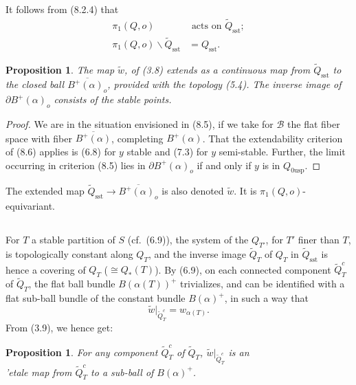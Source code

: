 \documentclass[12pt,a4paper]{article}
\theoremstyle{plain}
\newtheorem{proposition}[theorem]{Proposition}
\theoremstyle{definition}
\theoremstyle{remark}
\numberwithin{equation}{section}
\begin{document}
It follows from (8.2.4) that
\begin{align}
\pi_1(Q, o) &\text{ acts on } \widetilde{Q}_{\mathrm{sst}}; \label{eq:8.6.1} \\
\pi_1(Q, o) \backslash \widetilde{Q}_{\mathrm{sst}} &= Q_{\mathrm{sst}}. \label{eq:8.6.2}
\end{align}

\begin{proposition}\label{prop:8.7}
The map $\widetilde{w}$, of (3.8) extends as a continuous map from $\widetilde{Q}_{\mathrm{sst}}$ to the closed ball $\overline{B^+(\alpha)_o}$, provided with the topology (5.4). The inverse image of $\partial B^+(\alpha)_o$ consists of the stable points.
\end{proposition}

\begin{proof}
We are in the situation envisioned in (8.5), if we take for $\mathscr{B}$ the flat fiber space with fiber $\overline{B^+(\alpha)}$, completing $B^+(\alpha)$. That the extendability criterion of (8.6) applies is (6.8) for $y$ stable and (7.3) for $y$ semi-stable. Further, the limit occurring in criterion (8.5) lies in $\partial B^+(\alpha)_o$ if and only if $y$ is in $Q_{0\mathrm{usp}}$.
\end{proof}

The extended map $\widetilde{Q}_{\mathrm{sst}} \to \overline{B^+(\alpha)_o}$ is also denoted $\widetilde{w}$. It is $\pi_1(Q, o)$-equivariant.

\subsection{}
For $T$ a stable partition of $S$ (cf.\ (6.9)), the system of the $Q_{T'}$, for $T'$ finer than $T$, is topologically constant along $Q_T$, and the inverse image $\widetilde{Q}_T$ of $Q_T$ in $\widetilde{Q}_{\mathrm{sst}}$ is hence a covering of $Q_T$ ($\cong Q_*(T)$). By (6.9), on each connected component $\widetilde{Q}_T^c$ of $\widetilde{Q}_T$, the flat ball bundle $B(\alpha(T))^+$ trivializes, and can be identified with a flat sub-ball bundle of the constant bundle $B(\alpha)^+$, in such a way that
\begin{equation}\label{eq:8.8.1}
\widetilde{w}|_{\widetilde{Q}_T^c} = w_{\alpha(T)}.
\end{equation}
From (3.9), we hence get:
\begin{proposition}\label{prop:8.9}
For any component $\widetilde{Q}_T^c$ of $\widetilde{Q}_T$, $\widetilde{w}|_{\widetilde{Q}_T^c}$ is an \\'etale map from $\widetilde{Q}_T^c$ to a sub-ball of $B(\alpha)^+$.
\end{proposition}
\end{document}
